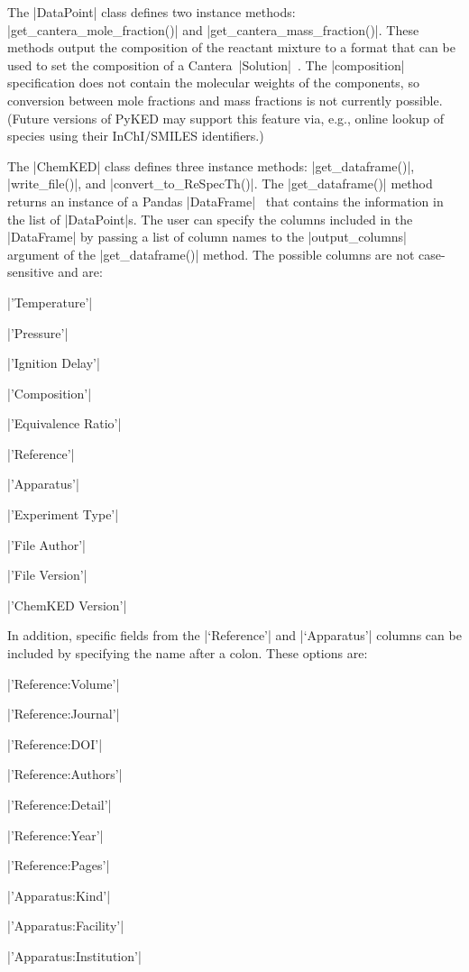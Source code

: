 \documentclass[12pt]{ijck}
\newcommand\pk{PyKED}
\begin{document}
The \pybox|DataPoint| class defines two instance methods:
\pybox|get_cantera_mole_fraction()| and \pybox|get_cantera_mass_fraction()|.
These methods output the composition of the reactant mixture to a
format that can be used to set the composition of a
Cantera~\pybox|Solution|~\autocite{Cantera:2.3.0}.
The \pybox|composition| specification does not contain the molecular
weights of the components, so conversion between mole fractions and mass
fractions is not currently possible. (Future versions of \pk{} may support this
feature via, e.g., online lookup of species using their InChI\slash SMILES
identifiers.)

The \pybox|ChemKED| class defines three instance methods:
\pybox|get_dataframe()|, \pybox|write_file()|, and \pybox|convert_to_ReSpecTh()|.
The \pybox|get_dataframe()| method returns an instance of a
Pandas \pybox|DataFrame|~\autocite{pandas} that contains the information in the
list of \pybox|DataPoint|s. The user can specify the columns included in the
\pybox|DataFrame| by passing a list of column names to the
\pybox|output_columns| argument of the \pybox|get_dataframe()| method. The
possible columns are not case-sensitive and are:
%
\noindent\begin{itemize*}
    \item \pybox|'Temperature'|
    \item \pybox|'Pressure'|
    \item \pybox|'Ignition Delay'|
    \item \pybox|'Composition'|
    \item \pybox|'Equivalence Ratio'|
    \item \pybox|'Reference'|
    \item \pybox|'Apparatus'|
    \item \pybox|'Experiment Type'|
    \item \pybox|'File Author'|
    \item \pybox|'File Version'|
    \item \pybox|'ChemKED Version'|
\end{itemize*}

In addition, specific fields from the \pybox|`Reference'| and \pybox|`Apparatus'|
columns can be included by specifying the name after a colon. These options
are:
%
\noindent\begin{itemize*}
    \item \pybox|'Reference:Volume'|
    \item \pybox|'Reference:Journal'|
    \item \pybox|'Reference:DOI'|
    \item \pybox|'Reference:Authors'|
    \item \pybox|'Reference:Detail'|
    \item \pybox|'Reference:Year'|
    \item \pybox|'Reference:Pages'|
    \item \pybox|'Apparatus:Kind'|
    \item \pybox|'Apparatus:Facility'|
    \item \pybox|'Apparatus:Institution'|
\end{itemize*}
\end{document}
